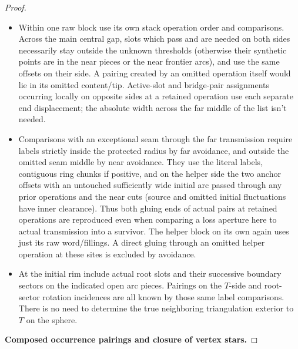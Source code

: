 \begin{proof}
\begin{itemize}
\item
  Within one raw block use its own stack operation order and comparisons. Across the main
  central gap, slots which pass and are needed on both sides necessarily stay outside the
  unknown thresholds (otherwise their synthetic points are in the near pieces or the near
  frontier arcs), and use the same offsets on their side. A pairing created by an omitted
  operation itself would lie in its omitted content/tip. Active-slot and bridge-pair
  assignments occurring locally on opposite sides at a retained operation use each
  separate end displacement; the absolute width across the far middle of the list isn't
  needed.
\item
  Comparisons with an exceptional seam through the far transmission require labels
  strictly inside the protected radius by far avoidance, and outside the omitted seam
  middle by near avoidance. They use the literal labels, contiguous ring chunks if
  positive, and on the helper side the two anchor offsets with an untouched sufficiently
  wide initial arc passed through any prior operations and the near cuts (source and
  omitted initial fluctuations have inner clearance). Thus both gluing ends of actual
  pairs at retained operations are reproduced even when comparing a loss aperture here to
  actual transmission into a survivor. The helper block on its own again uses just its raw
  word/fillings. A direct gluing through an omitted helper operation at these sites is
  excluded by avoidance.
\item
  At the initial rim include actual root slots and their successive boundary sectors on
  the indicated open arc pieces. Pairings on the \(T\)-side and root-sector rotation
  incidences are all known by those same label comparisons. There is no need to determine
  the true neighboring triangulation exterior to \(T\) on the sphere.
\end{itemize}

\smallskip
{}
\noindent\textbf{Composed occurrence pairings and closure of vertex stars.}\quad


\end{proof}
